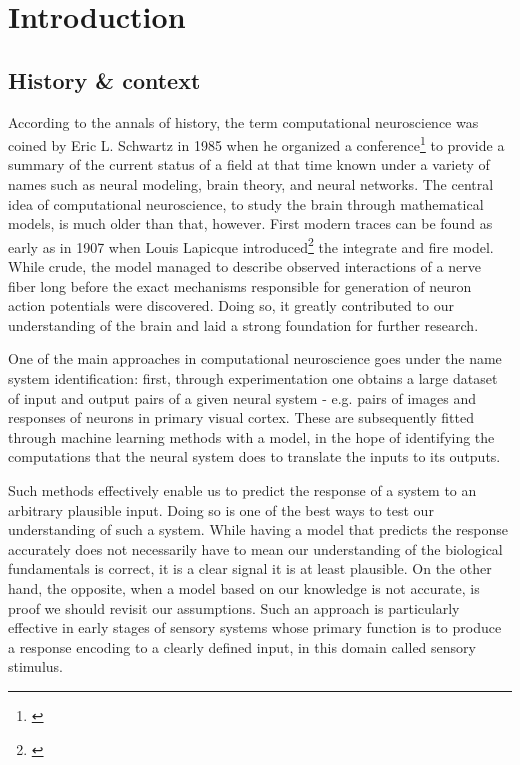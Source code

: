 \chapter*{Introduction}

\section*{History \& context}
According to the annals of history, the term computational neuroscience was coined by Eric L. Schwartz in 1985 when he organized a conference\footnote{\cite{schwartz1990computational}} to provide a summary of the current status of a field at that time known under a variety of names such as neural modeling, brain theory, and neural networks. The central idea of computational neuroscience, to study the brain through mathematical models, is much older than that, however. First modern traces can be found as early as in 1907 when Louis Lapicque introduced\footnote{\cite{Lapicque1907}} the integrate and fire model. While crude, the model managed to describe observed interactions of a nerve fiber long before the exact mechanisms responsible for generation of neuron action potentials were discovered. Doing so, it greatly contributed to our understanding of the brain and laid a strong foundation for further research.

One of the main approaches in computational neuroscience goes under the name system identification: first, through experimentation one obtains a large dataset of input and output pairs of a given neural system - e.g. pairs of images and responses of neurons in primary visual cortex. These are subsequently fitted through machine learning methods with a model, in the hope of identifying the computations that the neural system does to translate the inputs to its outputs. 

Such methods effectively enable us to predict the response of a system to an arbitrary plausible input. Doing so is one of the best ways to test our understanding of such a system. While having a model that predicts the response accurately does not necessarily have to mean our understanding of the biological fundamentals is correct, it is a clear signal it is at least plausible. On the other hand, the opposite, when a model based on our knowledge is not accurate, is proof we should revisit our assumptions. Such an approach is particularly effective in early stages of sensory systems whose primary function is to produce a response encoding to a clearly defined input, in this domain called sensory stimulus. 

